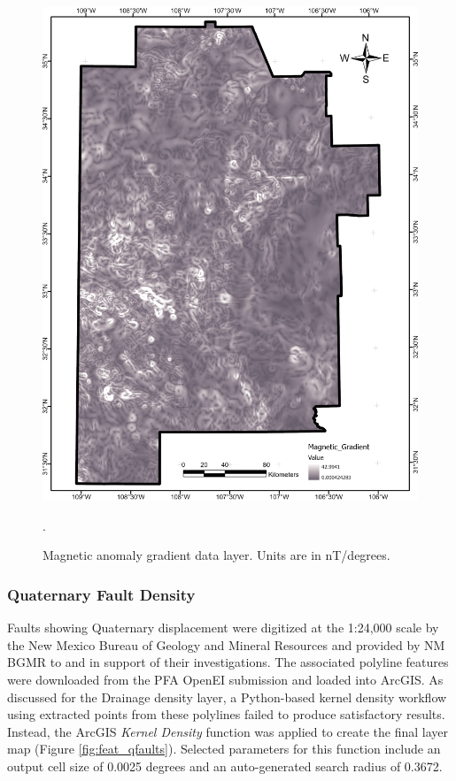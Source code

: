 \begin{figure}[!htp]
\centering
\includegraphics[scale=.50]{templates/images/Figure-MagneticGradient.png}
\caption[Magnetic anomaly gradient data layer]{Magnetic anomaly gradient data layer. Units are in nT/degrees.}.
\label{fig:feat_magnetic_gradient}
\end{figure}

\subsubsection{Quaternary Fault Density}

Faults showing Quaternary displacement were digitized at the 1:24,000 scale by the New Mexico Bureau of Geology and Mineral Resources and provided by NM BGMR to \citet{bielicki_hydrogeolgic_2015} and \citet{pepin_new_2018} in support of their investigations. The associated polyline features were downloaded from the PFA OpenEI submission \citep{kelley_geothermal_2015} and loaded into ArcGIS. As discussed for the Drainage density layer, a Python-based kernel density workflow using extracted points from these polylines failed to produce satisfactory results. Instead, the ArcGIS \textit{Kernel Density} function was applied to create the final layer map (Figure \ref{fig:feat_qfaults}). Selected parameters for this function include an output cell size of 0.0025 degrees and an auto-generated search radius of 0.3672.

